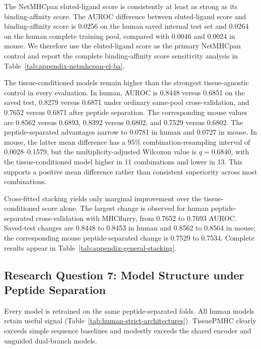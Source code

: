 The NetMHCpan eluted-ligand score is consistently at least as strong as its binding-affinity score. The AUROC difference between eluted-ligand score and binding-affinity score is 0.0256 on the human saved internal test set and 0.0264 on the human complete training pool, compared with 0.0046 and 0.0024 in mouse. We therefore use the eluted-ligand score as the primary NetMHCpan control and report the complete binding-affinity score sensitivity analysis in Table~\ref{tab:appendix-netmhcpan-el-ba}.

The tissue-conditioned models remain higher than the strongest tissue-agnostic control in every evaluation. In human, AUROC is 0.8448 versus 0.6851 on the saved test, 0.8279 versus 0.6871 under ordinary same-pool cross-validation, and 0.7652 versus 0.6871 after peptide separation. The corresponding mouse values are 0.8562 versus 0.6893, 0.8392 versus 0.6802, and 0.7529 versus 0.6802. The peptide-separated advantages narrow to 0.0781 in human and 0.0727 in mouse. In mouse, the latter mean difference has a 95\% combination-resampling interval of 0.0028--0.1579, but the multiplicity-adjusted Wilcoxon value is \(q=0.6840\), with the tissue-conditioned model higher in 11 combinations and lower in 13. This supports a positive mean difference rather than consistent superiority across most combinations.

Cross-fitted stacking yields only marginal improvement over the tissue-conditioned score alone. The largest change is observed for human peptide-separated cross-validation with MHCflurry, from 0.7652 to 0.7693 AUROC. Saved-test changes are 0.8448 to 0.8453 in human and 0.8562 to 0.8564 in mouse; the corresponding mouse peptide-separated change is 0.7529 to 0.7534. Complete results appear in Table~\ref{tab:appendix-general-stacking}.

\subsection{Research Question 7: Model Structure under Peptide Separation}

Every model is retrained on the same peptide-separated folds. All human models retain useful signal (Table~\ref{tab:human-strict-architectures}). TissuePMHC clearly exceeds simple sequence baselines and modestly exceeds the shared encoder and unguided dual-branch models.

